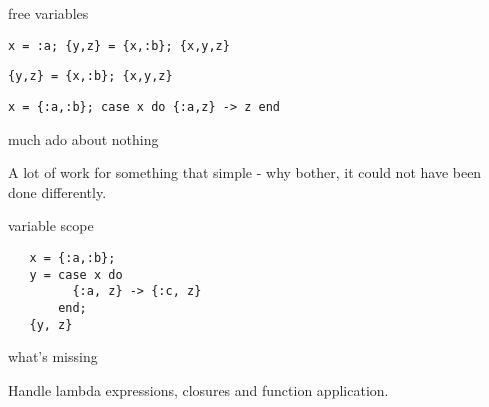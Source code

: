 \begin{frame}{free variables}

{\tt x = :a; \{y,z\} = \{x,:b\}; \{x,y,z\}}

\pause\vspace{20pt}

{\tt \{y,z\} = \{x,:b\}; \{x,y,z\}}

\pause\vspace{20pt}

{\tt x = \{:a,:b\}; case x do \{:a,z\} -> z end}

\end{frame}

\begin{frame}{much ado about nothing}

A lot of work for something that simple - why bother, it could not have
been done differently.
\end{frame}


\begin{frame}[fragile]{variable scope}

\vspace{20pt}

\hspace{20pt}
\begin{verbatim}
   x = {:a,:b};
   y = case x do
         {:a, z} -> {:c, z}
       end;
   {y, z}
\end{verbatim}


\end{frame}
 
\begin{frame}{what's missing}

\vspace{20pt}\hspace{20pt} Handle lambda expressions, closures and function application.
  
\end{frame}





